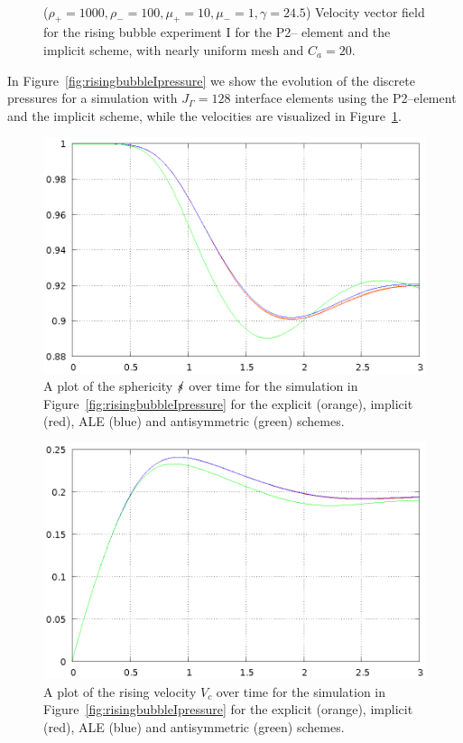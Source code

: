 \begin{figure}[htbp]
\centering
{}
\\
\caption[Navier--Stokes rising bubble I velocity]
{($\rho_+ = 1000,\rho_- = 100,\mu_+ = 10,\mu_- =1,\gamma = 24.5$)
Velocity vector field for the rising bubble experiment I for the P2--\pdg
element and the implicit scheme, with nearly uniform mesh and
$C_a=20$\textdegree.}
\label{fig:risingbubbleIvelocity}
\end{figure}
In Figure~\ref{fig:risingbubbleIpressure} we show the evolution of the discrete
pressures for a simulation with $J_\Gamma=128$ interface elements using the
P2--\pdg element and the implicit scheme, while the velocities are visualized
in Figure~\ref{fig:risingbubbleIvelocity}.

\begin{figure}[htbp]
\centering
\includegraphics[width=.45\textwidth]
{figures/navier_stokes/2d_rising_bubble_sphericity.ps}
\caption[Navier--Stokes rising bubble I sphericity]
{A plot of the sphericity $\mbox{$s\!\!\!\!\:/$}$ over time for the simulation in
Figure~\ref{fig:risingbubbleIpressure} for the explicit (orange), implicit
(red), ALE (blue) and antisymmetric (green) schemes.}
\label{fig:risingbubbleIsphericity}
\end{figure}

\begin{figure}[htbp]
\centering
\includegraphics[width=.45\textwidth]
{figures/navier_stokes/2d_rising_bubble_rising_velocity.ps}
\caption[Navier--Stokes rising bubble I rising velocity]
{A plot of the rising velocity $V_c$ over time for the simulation in
Figure~\ref{fig:risingbubbleIpressure} for the explicit (orange), implicit
(red), ALE (blue) and antisymmetric (green) schemes.}
\label{fig:risingbubbleIrisingvelocity}
\end{figure}


